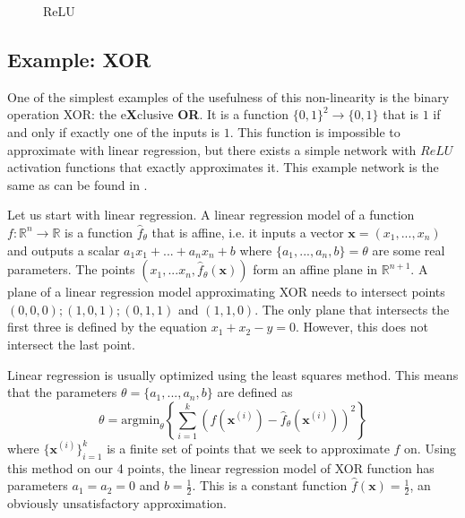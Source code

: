 \begin{figure}[h]
\caption{ReLU}
\center
{}
\end{figure}

\subsection{Example: XOR}
\label{section:xor}
One of the simplest examples of the usefulness of this non-linearity is the binary operation XOR: the e\textbf{X}clusive \textbf{OR}. It is a function $\{0,1\}^2\rightarrow \{0,1\}$ that is $1$ if and only if exactly one of the inputs is $1$. This function is impossible to approximate with linear regression, but there exists a simple network with $ReLU$ activation functions that exactly approximates it. This example network is the same as can be found in \cite{neural}.

Let us start with linear regression. A linear regression model of a function $f:\mathbb{R}^n\rightarrow \mathbb{R}$ is a function $\widehat{f}_\theta$ that is affine, i.e. it inputs a vector $\textbf{x}=(x_1,...,x_n)$ and outputs a scalar $a_1x_1+...+a_nx_n+b$ where $\{a_1,...,a_n,b\}=\theta$ are some real parameters. The points $(x_1,...x_n,\widehat{f}_\theta(\textbf{x}))$ form an affine plane in $\mathbb{R}^{n+1}$. A plane of a linear regression model approximating XOR needs to intersect points $(0,0,0);(1,0,1);(0,1,1)$ and $(1,1,0)$. The only plane that intersects the first three is defined by the equation $x_1+x_2-y=0$. However, this does not intersect the last point.

Linear regression is usually optimized using the least squares method. This means that the parameters $\theta=\{a_1,...,a_n,b\}$ are defined as $$\theta=\text{argmin}_\theta\left\{\sum_{i=1}^k \left(f(\textbf{x}^{(i)})-\widehat{f}_\theta(\textbf{x}^{(i)})\right)^2\right\}$$ where $\{\textbf{x}^{(i)}\}_{i=1}^k$ is a finite set of points that we seek to approximate $f$ on. Using this method on our 4 points, the linear regression model of XOR function has parameters $a_1=a_2=0$ and $b=\frac{1}{2}$. This is a constant function $\widehat{f}(\textbf{x})=\frac{1}{2}$, an obviously unsatisfactory approximation.

